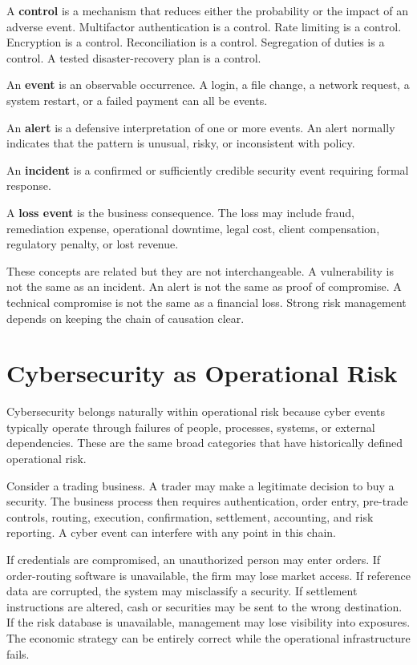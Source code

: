 A \textbf{control} is a mechanism that reduces either the probability or the impact of an adverse event. Multifactor authentication is a control. Rate limiting is a control. Encryption is a control. Reconciliation is a control. Segregation of duties is a control. A tested disaster-recovery plan is a control.

An \textbf{event} is an observable occurrence. A login, a file change, a network request, a system restart, or a failed payment can all be events.

An \textbf{alert} is a defensive interpretation of one or more events. An alert normally indicates that the pattern is unusual, risky, or inconsistent with policy.

An \textbf{incident} is a confirmed or sufficiently credible security event requiring formal response.

A \textbf{loss event} is the business consequence. The loss may include fraud, remediation expense, operational downtime, legal cost, client compensation, regulatory penalty, or lost revenue.

These concepts are related but they are not interchangeable. A vulnerability is not the same as an incident. An alert is not the same as proof of compromise. A technical compromise is not the same as a financial loss. Strong risk management depends on keeping the chain of causation clear.

\section{Cybersecurity as Operational Risk}

Cybersecurity belongs naturally within operational risk because cyber events typically operate through failures of people, processes, systems, or external dependencies. These are the same broad categories that have historically defined operational risk.

Consider a trading business. A trader may make a legitimate decision to buy a security. The business process then requires authentication, order entry, pre-trade controls, routing, execution, confirmation, settlement, accounting, and risk reporting. A cyber event can interfere with any point in this chain.

If credentials are compromised, an unauthorized person may enter orders. If order-routing software is unavailable, the firm may lose market access. If reference data are corrupted, the system may misclassify a security. If settlement instructions are altered, cash or securities may be sent to the wrong destination. If the risk database is unavailable, management may lose visibility into exposures. The economic strategy can be entirely correct while the operational infrastructure fails.

